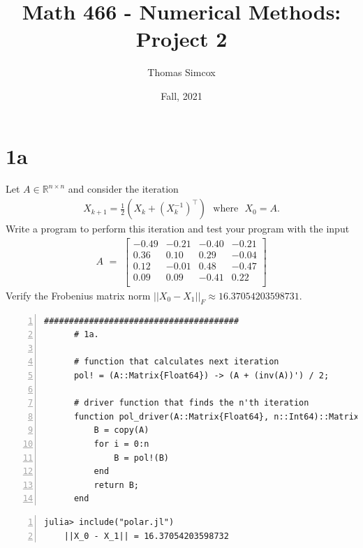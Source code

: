 \documentclass{article}
\title{Math 466 - Numerical Methods: Project 2}
\author{Thomas Simcox}
\date{Fall, 2021}
\begin{document}
    \vspace{30em}
    \maketitle
    \begin{center}
    \end{center}


    \vspace{3em}

    \section*{1a}
    Let $A \in \mathbb{R}^{n\times n}$ and consider the iteration
    \begin{align*}
        X_{k+1} = \frac{1}{2}\left(X_k + \left(X_k^{-1}\right)^{\top}\right) \,\,\text{  where  }\,\, X_0 = A.
    \end{align*}
    Write a program to perform this iteration and test your program with the input
    \begin{align*}
        A\,\,=\,\, \begin{bmatrix}
            -0.49 & -0.21 & -0.40 & -0.21\\[.5em]
            0.36 & 0.10 & 0.29 & -0.04\\[.5em]
            0.12 & -0.01 & 0.48 & -0.47\\[.5em]
            0.09 & 0.09 & -0.41 & 0.22\\
        \end{bmatrix}
    \end{align*}
    Verify the Frobenius matrix norm $||X_0 - X_1||_F \approx 16.37054203598731$.\\
    
    \newpage
    \begin{Verbatim}[frame=single, label=Find first iteration, numbers=left, fontsize=\small, xleftmargin=-.5cm, xrightmargin=-0.5cm, framesep=3mm]
      #######################################
      # 1a.

      # function that calculates next iteration
      pol! = (A::Matrix{Float64}) -> (A + (inv(A))') / 2;
      
      # driver function that finds the n'th iteration
      function pol_driver(A::Matrix{Float64}, n::Int64)::Matrix{Float64}
          B = copy(A)
          for i = 0:n
              B = pol!(B)
          end 
          return B;
      end 
    \end{Verbatim}
    \vspace{2em}
    \begin{Verbatim}[frame=single, label=Julia REPL for first iteration, numbers=left, fontsize=\small, xleftmargin=-.5cm, xrightmargin=-0.5cm, framesep=3mm]
    julia> include("polar.jl")
    ||X_0 - X_1|| = 16.37054203598732
    \end{Verbatim}
\end{document}
